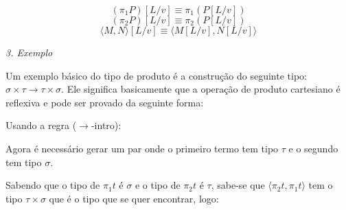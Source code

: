 \documentclass[../main.tex]{subfiles}
\begin{document}
$$(\pi_1 P)[L/v] \equiv \pi_1 (P[L/v])$$
$$(\pi_2 P)[L/v] \equiv \pi_2 (P[L/v])$$
$$\langle M, N \rangle [L/v] \equiv \langle M [L/v], N [L/v] \rangle$$


\emph{3. Exemplo}

Um exemplo básico do tipo de produto é a construção do seguinte tipo: $\sigma \times \tau \to \tau \times \sigma$. Ele significa basicamente que a operação de produto cartesiano é reflexiva e pode ser provado da seguinte forma:

\begin{prooftree}
\end{prooftree}

Usando a regra ($\to$-intro):

\begin{prooftree}
\end{prooftree}

Agora é necessário gerar um par onde o primeiro termo tem tipo $\tau$ e o segundo tem tipo $\sigma$.

\begin{prooftree}
\end{prooftree}

Sabendo que o tipo de $\pi_1 t$ é $\sigma$ e o tipo de $\pi_2 t$ é $\tau$, sabe-se que $\langle \pi_2 t, \pi_1 t \rangle$ tem o tipo $\tau \times \sigma$ que é o tipo que se quer encontrar, logo:

\begin{prooftree}
\end{prooftree}
\end{document}
